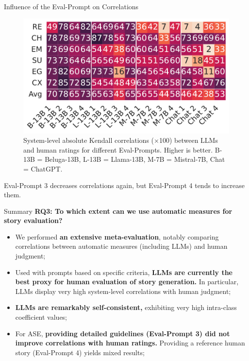 \begin{frame}{Influence of the Eval-Prompt on Correlations}
    \begin{figure}[!h]
        \centering
        \includegraphics[width=0.7\columnwidth]{pictures/llm_mixed2_w_system_kendall.pdf}
        \caption{System-level absolute Kendall correlations ($\times$100) between LLMs and human ratings for different Eval-Prompts. Higher is better. B-13B = Beluga-13B, L-13B = Llama-13B, M-7B = Mistral-7B, Chat = ChatGPT.}
        \label{fig:system_level_kendall_mixed2_correlations}
    \end{figure}
    \vspace*{-0.4cm}
    Eval-Prompt 3 decreases correlations again, but Eval-Prompt 4 tends to increase them.
\end{frame}

\begin{frame}{Summary}
    \textbf{RQ3: To which extent can we use automatic measures for story evaluation?}
    \begin{itemize}
        \item We performed \textbf{an extensive meta-evaluation}, notably comparing correlations between automatic measures (including LLMs) and human judgment;
        \item Used with prompts based on specific criteria, \textbf{LLMs are currently the best proxy for human evaluation of story generation.} In particular, LLMs display very high system-level correlations with human judgment;
        \item \textbf{LLMs are remarkably self-consistent,} exhibiting very high intra-class coefficient values;
        \item For ASE, \textbf{providing detailed guidelines (Eval-Prompt 3) did not improve correlations with human ratings.} Providing a reference human story (Eval-Prompt 4) yields mixed results;
    \end{itemize}
\end{frame}